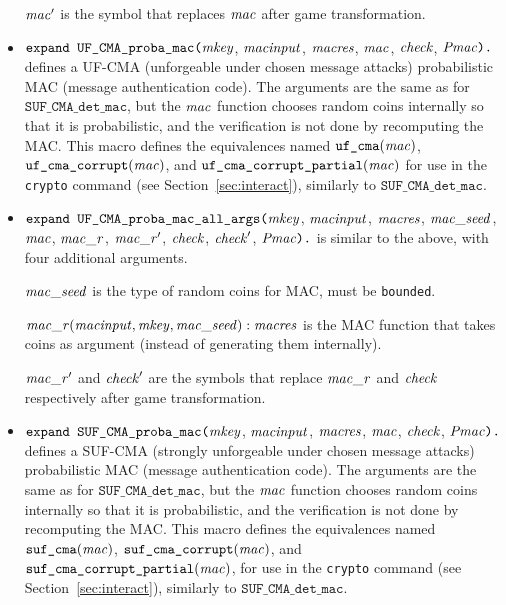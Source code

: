 \documentclass{article}
\begin{document}
\begin{itemize}
  $\mathit{mac}'$ is the symbol that replaces $\mathit{mac}$ after game transformation.

\item $\texttt{expand UF\_CMA\_proba\_mac(}\mathit{mkey}$,
$  \mathit{macinput}$, $\mathit{macres}$, $\mathit{mac}$, $\mathit{check}$,
$  \mathit{Pmac}\texttt{).}$ defines a UF-CMA (unforgeable under chosen
  message attacks) probabilistic MAC (message authentication code).
  The arguments are the same as for $\texttt{SUF\_CMA\_det\_mac}$, but the $\mathit{mac}$ function chooses random
  coins internally so that it is probabilistic, and the verification is not done by recomputing the MAC.
   This macro defines the equivalences named
   $\texttt{uf\_cma}(\mathit{mac})$,
   $\texttt{uf\_cma\_corrupt}(\mathit{mac})$, and
   $\texttt{uf\_cma\_corrupt\_partial}(\mathit{mac})$ for use in the
   \texttt{crypto} command (see Section~\ref{sec:interact}),
   similarly to $\texttt{SUF\_CMA\_det\_mac}$.

\item $\texttt{expand UF\_CMA\_proba\_mac\_all\_args(}\mathit{mkey}$,
$  \mathit{macinput}$, $\mathit{macres}$, $\mathit{mac\_seed}$, $\mathit{mac}$, $\mathit{mac\_r}$, $\mathit{mac\_r}'$, $\mathit{check}$, $\mathit{check}'$,
$  \mathit{Pmac}\texttt{).}$ is similar to the above,
  with four additional arguments. 

  $\mathit{mac\_seed}$ is the type of random coins for MAC, must be \texttt{bounded}.

  $\mathit{mac\_r}(\mathit{macinput}, \mathit{mkey}, \mathit{mac\_seed}): \mathit{macres}$ is the MAC function that takes coins as argument (instead of generating them internally).

  $\mathit{mac\_r}'$ and $\mathit{check}'$ are the symbols that replace $\mathit{mac\_r}$ and $\mathit{check}$ respectively after game transformation.

\item $\texttt{expand SUF\_CMA\_proba\_mac(}\mathit{mkey}$,
$  \mathit{macinput}$, $\mathit{macres}$, $\mathit{mac}$, $\mathit{check}$,
$  \mathit{Pmac}\texttt{).}$ defines a SUF-CMA (strongly unforgeable under
  chosen message attacks) probabilistic MAC (message authentication code). 
  The arguments are the same as for $\texttt{SUF\_CMA\_det\_mac}$, but the $\mathit{mac}$ function chooses random
  coins internally so that it is probabilistic, and the verification is not done by recomputing the MAC.
  This macro defines the equivalences named
   $\texttt{suf\_cma}(\mathit{mac})$,
   $\texttt{suf\_cma\_corrupt}(\mathit{mac})$, and
   $\texttt{suf\_cma\_corrupt\_partial}(\mathit{mac})$, for use in the
   \texttt{crypto} command (see Section~\ref{sec:interact}),
   similarly to $\texttt{SUF\_CMA\_det\_mac}$.


\end{itemize}
\end{document}
